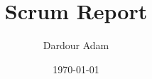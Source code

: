 \documentclass[a4paper, 12pt, english]{report}
\begin{document}
\title{Scrum Report}
\author{Dardour Adam}
\date{\today}
\maketitle





\end{document}
